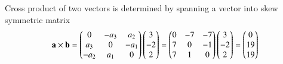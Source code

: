 Cross product of two vectors is determined by spanning a vector into skew symmetric matrix
\begin{align}
\mathbf{a \times \mathbf{b}}
=\begin{pmatrix}0 & -a_3 & a_2\\
   a_3 & 0 & -a_1\\
   -a_2 & a_1 & 0\\\end{pmatrix}
  \begin{pmatrix}3\\-2\\2\end{pmatrix}
=\begin{pmatrix}0 & -7 & -7\\
  7 & 0 & -1\\
  7 & 1 & 0\\\end{pmatrix}
 \begin{pmatrix}3\\-2\\2\end{pmatrix}
=\begin{pmatrix}0\\19\\19\end{pmatrix}
\end{align}
